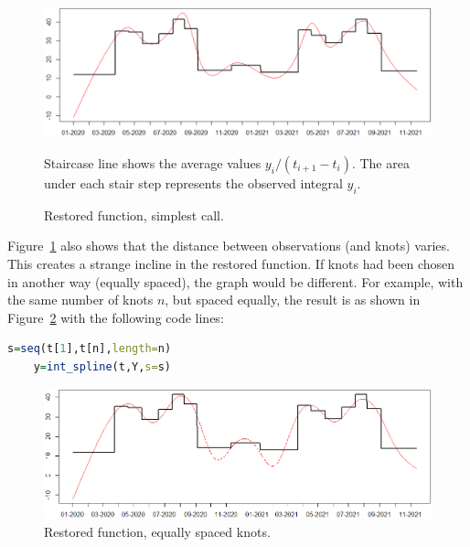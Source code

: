 \documentclass[a4paper,10pt]{article}
\begin{document}
%
\begin{figure}[h]
	\centering
	\includegraphics[width=\linewidth]{coincide_observations.png}
	\caption{\label{fig:coincide_observations} Restored function, simplest call.}
	\small{ Staircase line shows the average values $y_i/(t_{i+1}-t_i)$. The area under each stair step represents the observed integral $y_i$.}
\end{figure}
%
%
Figure~\ref{fig:coincide_observations} also shows that the distance between observations (and knots) varies. This creates a strange incline in the restored function.
If knots had been chosen in another way (equally spaced), the graph would be different.
For example, with the same number of knots $n$, but spaced equally, the result is as shown in Figure~\ref{fig:equally_spaced} with the  following code lines:
\begin{lstlisting}[language=R]
	s=seq(t[1],t[n],length=n)
	y=int_spline(t,Y,s=s)	
\end{lstlisting}
%
\begin{figure}[h]
	\centering
	\includegraphics[width=\linewidth]{equally_spaced.png}
	\caption{\label{fig:equally_spaced}  Restored function, equally spaced knots.}
\end{figure}
\end{document}
